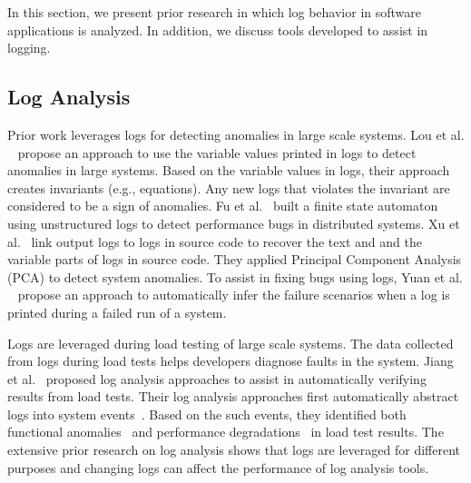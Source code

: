 
In this section, we present prior research in which log behavior in software applications is analyzed. In addition, we discuss tools developed to assist in logging. 

\subsection{Log Analysis}

Prior work leverages logs for detecting anomalies in large scale systems. Lou {et al}$.$~\cite{JGLouMining} propose an approach to use the variable values printed in logs to detect anomalies in large systems. Based on the variable values in logs, their approach creates invariants (e.g., equations). Any new logs that violates the invariant are considered to be a sign of anomalies. Fu {et al}$ . $~\cite{QFuanomaly} built a finite state automaton using unstructured logs to detect performance bugs in distributed systems.  \indent Xu {et al}$.$~\cite{ConsoleLogs} link output logs to logs in source code to recover the text and and the variable parts of logs in source code. They applied Principal Component Analysis (PCA) to detect system anomalies. To assist in fixing bugs using logs, Yuan {et al$.$}~\cite{Yuan:2010:SED:1736020.1736038} propose an approach to automatically infer the failure scenarios when a log is printed during a failed run of a system.
%
%

Logs are leveraged during load testing of large scale systems. The data collected from logs during load tests helps developers diagnose faults in the system. Jiang {et al$ . $}~\cite{Jiang:2008:AAA:1400155.1400158,JiangICSM2008,JiangICSM20092,Jiang:2010:ICS:1850000.1850068} proposed log analysis approaches to assist in automatically verifying results from load tests. Their log analysis approaches first automatically abstract logs into system events~\cite{Jiang:2008:AAA:1400155.1400158}. Based on the such events, they identified both functional anomalies~\cite{JiangICSM2008} and performance degradations~\cite{JiangICSM20092} in load test results. The extensive prior research on log analysis shows that logs are leveraged for different purposes and changing logs can affect the performance of log analysis tools. 




